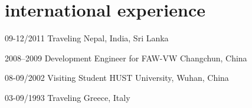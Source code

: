 \documentclass[]{friggeri-cv} %
\begin{document}

\section{international experience }

\begin{entrylist}

\entry
{09-12/2011}
{\normalfont Traveling}
{Nepal, India, Sri Lanka}
{\vspace{-4mm}}

\entry
{2008--2009}
{\normalfont Development Engineer for FAW-VW}
{Changchun, China}
{\vspace{-4mm}}

\entry
{08-09/2002}
{\normalfont Visiting Student}
{HUST University, Wuhan, China}
{\vspace{-4mm}}

\entry
{03-09/1993}
{\normalfont Traveling}
{Greece, Italy}
{\vspace{-4mm}}

\end{entrylist}



\end{document}
